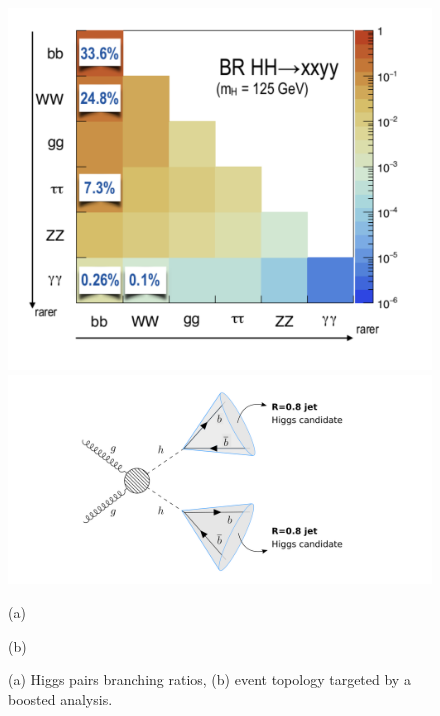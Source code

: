 \begin{figure}
	\centering
	\begin{minipage}{.45\textwidth}
		\centering
		\includegraphics[width=\linewidth]{./Figures/hhBR.png}
	\end{minipage}%
	\begin{minipage}{.55\textwidth}
		\centering
		\includegraphics[trim={4cm 0 5cm 0},clip,width=\linewidth]{./Figures/boosted1.png}
	\end{minipage}
	\begin{minipage}[t]{0.45\textwidth}
		\caption*{(a)}
	\end{minipage}%
	\hfill
	\begin{minipage}[t]{0.55\textwidth}
		\caption*{(b)}
	\end{minipage}
	\caption{(a) Higgs pairs branching ratios, (b) event topology targeted by a boosted analysis.}
	\label{fig:boosted}
\end{figure}

